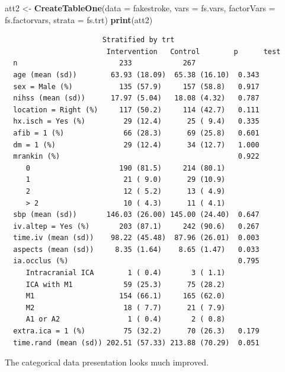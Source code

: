 \documentclass[]{book}
\newenvironment{Shaded}{\begin{snugshade}}{\end{snugshade}}
\newcommand{\KeywordTok}[1]{\textcolor[rgb]{0.13,0.29,0.53}{\textbf{#1}}}
\newcommand{\DataTypeTok}[1]{\textcolor[rgb]{0.13,0.29,0.53}{#1}}
\newcommand{\StringTok}[1]{\textcolor[rgb]{0.31,0.60,0.02}{#1}}
\newcommand{\NormalTok}[1]{#1}
\theoremstyle{definition}
\theoremstyle{definition}
\theoremstyle{definition}
\theoremstyle{remark}
\begin{document}
\begin{Shaded}
\begin{Highlighting}[]
\NormalTok{att2 <-}\StringTok{ }\KeywordTok{CreateTableOne}\NormalTok{(}\DataTypeTok{data =}\NormalTok{ fakestroke, }
                       \DataTypeTok{vars =}\NormalTok{ fs.vars,}
                       \DataTypeTok{factorVars =}\NormalTok{ fs.factorvars,}
                       \DataTypeTok{strata =}\NormalTok{ fs.trt)}
\KeywordTok{print}\NormalTok{(att2)}
\end{Highlighting}
\end{Shaded}

\begin{verbatim}
                       Stratified by trt
                        Intervention   Control        p      test
  n                        233            267                    
  age (mean (sd))        63.93 (18.09)  65.38 (16.10)  0.343     
  sex = Male (%)           135 (57.9)     157 (58.8)   0.917     
  nihss (mean (sd))      17.97 (5.04)   18.08 (4.32)   0.787     
  location = Right (%)     117 (50.2)     114 (42.7)   0.111     
  hx.isch = Yes (%)         29 (12.4)      25 ( 9.4)   0.335     
  afib = 1 (%)              66 (28.3)      69 (25.8)   0.601     
  dm = 1 (%)                29 (12.4)      34 (12.7)   1.000     
  mrankin (%)                                          0.922     
     0                     190 (81.5)     214 (80.1)             
     1                      21 ( 9.0)      29 (10.9)             
     2                      12 ( 5.2)      13 ( 4.9)             
     > 2                    10 ( 4.3)      11 ( 4.1)             
  sbp (mean (sd))       146.03 (26.00) 145.00 (24.40)  0.647     
  iv.altep = Yes (%)       203 (87.1)     242 (90.6)   0.267     
  time.iv (mean (sd))    98.22 (45.48)  87.96 (26.01)  0.003     
  aspects (mean (sd))     8.35 (1.64)    8.65 (1.47)   0.033     
  ia.occlus (%)                                        0.795     
     Intracranial ICA        1 ( 0.4)       3 ( 1.1)             
     ICA with M1            59 (25.3)      75 (28.2)             
     M1                    154 (66.1)     165 (62.0)             
     M2                     18 ( 7.7)      21 ( 7.9)             
     A1 or A2                1 ( 0.4)       2 ( 0.8)             
  extra.ica = 1 (%)         75 (32.2)      70 (26.3)   0.179     
  time.rand (mean (sd)) 202.51 (57.33) 213.88 (70.29)  0.051     
\end{verbatim}

The categorical data presentation looks much improved.
\end{document}
